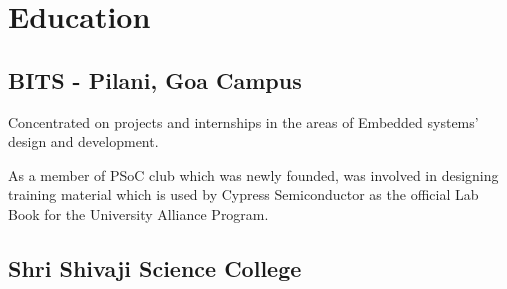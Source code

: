 \documentclass[letterpaper]{deedy-resume} %
\begin{document}
\begin{minipage}[t]{0.66\textwidth}
\section{Education}

\subsection{BITS - Pilani, Goa Campus}

\begin{tightitemize}
\item Concentrated on projects and internships in the areas of Embedded systems' design and development.
\item As a member of PSoC club which was newly founded, was involved in designing training material which is used by Cypress Semiconductor as the official Lab Book for the University Alliance Program.
\end{tightitemize}

\sectionspace %

\subsection{Shri Shivaji Science College}

\sectionspace %

\end{minipage} %


\newpage %
\end{document}
